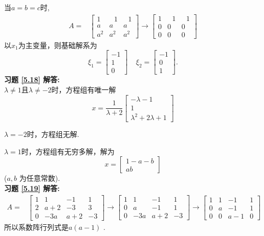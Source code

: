 当$a=b=c$时,
\begin{displaymath}
\begin{aligned}
A=&\begin{bmatrix}1&\ \ \ 1&\ \ \ 1\\a&a&a\\a^2&a^2&a^2 \end{bmatrix}\rightarrow
\begin{bmatrix} 1&\ \ \ 1&\ \ \ 1\\0&0&0\\0&0&0 \end{bmatrix}
\end{aligned} \end{displaymath}
以$x_1$为主变量，则基础解系为$$\xi_1=\begin{bmatrix}-1\\1\\0\end{bmatrix}\ \ \ \ \ \xi_2=\begin{bmatrix}-1\\0\\1\end{bmatrix}.$$
\textbf{习题 \ref{5.18} 解答:}\\
 $\lambda\not=1$且$\lambda\not=-2$时，方程组有唯一解$$x=\frac{1}{\lambda+2} \begin{bmatrix} -\lambda-1\\1\\ \lambda ^2+2\lambda+1\end{bmatrix}$$

$\lambda=-2$时，方程组无解.


$\lambda=1$时，方程组有无穷多解，解为$$x=\begin{bmatrix}1-a-b\\ab\end{bmatrix}$$   ($a,b$ 为任意常数).\\
\textbf{习题 \ref{5.19} 解答:}\\
\begin{displaymath}
\begin{aligned}
A=&\begin{bmatrix} 1&1&-1&1\\2&a+2&-3&3\\0&-3a&a+2&-3  \end{bmatrix}\rightarrow
\begin{bmatrix}1&1&-1&1\\0&a&-1&1\\0&-3a&a+2&-3   \end{bmatrix}\rightarrow
\begin{bmatrix} 1&1&-1&1\\0&a&-1&1\\0&0&a-1&0  \end{bmatrix}\end{aligned} \end{displaymath}
所以系数阵行列式是$a(a-1)$ .

